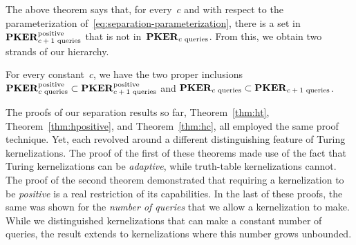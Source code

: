 The above theorem says that, for every~$c$ and with respect to the parameterization of~\eqref{eq:separation-parameterization}, there is a set in $\textnormal{\textbf{PKER}}^\textnormal{positive}_\textnormal{$c + 1$ queries}$ that is not in~$\textnormal{\textbf{PKER}}_\textnormal{$c$ queries}$.
From this, we obtain two strands of our hierarchy.
\begin{corollary}
\label{cor:hc}%
  For every constant~$c$, we have the two proper inclusions $\textnormal{\textbf{PKER}}^\textnormal{positive}_\textnormal{$c$ queries} \subset \textnormal{\textbf{PKER}}^\textnormal{positive}_\textnormal{$c + 1$ queries}$ and $\textnormal{\textbf{PKER}}_\textnormal{$c$ queries} \subset \textnormal{\textbf{PKER}}_\textnormal{$c + 1$ queries}$.
\end{corollary}

The proofs of our separation results so far, Theorem~\ref{thm:ht}, Theorem~\ref{thm:hpositive}, and Theorem~\ref{thm:hc}, all employed the same proof technique.
Yet, each revolved around a different distinguishing feature of Turing kernelizations.
The proof of the first of these theorems made use of the fact that Turing kernelizations can be \emph{adaptive}, while truth-table kernelizations cannot.
The proof of the second theorem demonstrated that requiring a kernelization to be \emph{positive} is a real restriction of its capabilities.
In the last of these proofs, the same was shown for the \emph{number of queries} that we allow a kernelization to make.
While we distinguished kernelizations that can make a constant number of queries, the result extends to kernelizations where this number grows unbounded.

